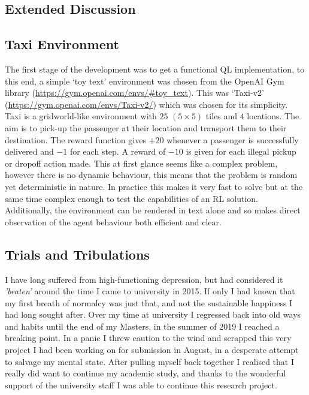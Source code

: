 \documentclass[hidelinks,journal]{IEEEtran}
\begin{document}
\begin{appendices}

\section{Extended Discussion}
\subsection{Taxi Environment}
\label{apx:taxi}
The first stage of the development was to get a functional QL implementation, to this end, a simple ‘toy text’ environment was chosen from the OpenAI Gym library (\url{https://gym.openai.com/envs/#toy_text}). This was ‘Taxi-v2’ (\url{https://gym.openai.com/envs/Taxi-v2/}) which was chosen for its simplicity. Taxi is a gridworld-like environment with $25$ $(5\times5)$ tiles and $4$ locations. The aim is to pick-up the passenger at their location and transport them to their destination. The reward function gives $+20$ whenever a passenger is successfully delivered and $-1$ for each step. A reward of $-10$ is given for each illegal pickup or dropoff action made. This at first glance seems like a complex problem, however there is no dynamic behaviour, this means that the problem is random yet deterministic in nature. In practice this makes it very fast to solve but at the same time complex enough to test the capabilities of an RL solution. Additionally, the environment can be rendered in text alone and so makes direct observation of the agent behaviour both efficient and clear.

\subsection{Trials and Tribulations}\label{apx:personalDifficulties}
I have long suffered from high-functioning depression, but had considered it \textit{'beaten'} around the time I came to university in 2015. If only I had known that my first breath of normalcy was just that, and not the sustainable happiness I had long sought after. Over my time at university I regressed back into old ways and habits until the end of my Masters, in the summer of 2019 I reached a breaking point. In a panic I threw caution to the wind and scrapped this very project I had been working on for submission in August, in a desperate attempt to salvage my mental state. After pulling myself back together I realised that I really did want to continue my academic study, and thanks to the wonderful support of the university staff I was able to continue this research project.


\end{appendices}
\end{document}
